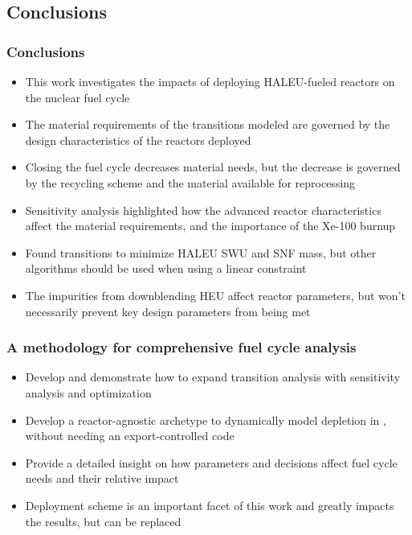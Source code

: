 \subsection{Conclusions}
\begin{frame}
      \frametitle{Conclusions}
      \begin{itemize}
        \item This work investigates the impacts of deploying \gls{HALEU}-fueled 
              reactors on the nuclear fuel cycle
        \item<2-> The material requirements of the transitions modeled are governed 
              by the design characteristics of the reactors deployed
        \item<2-> Closing the fuel cycle decreases material needs, but the 
              decrease is governed by the recycling scheme and the 
              material available for reprocessing
        \item<3-> Sensitivity analysis highlighted how the 
              advanced reactor characteristics affect the material requirements, and 
              the importance of the Xe-100 burnup
        \item<3-> Found transitions to minimize \gls{HALEU} \gls{SWU} 
              and \gls{SNF} mass, but other algorithms should 
              be used when using a linear constraint
        \item<4-> The impurities from downblending \gls{HEU} affect 
              reactor parameters, but won't necessarily prevent key design 
              parameters from being met
      \end{itemize}
\end{frame}

\begin{frame}
      \frametitle{A methodology for comprehensive fuel cycle analysis}
      \begin{itemize}
            \item Develop and demonstrate how to expand transition analysis with 
                  sensitivity analysis and optimization
            \item Develop a reactor-agnostic archetype to dynamically model depletion 
                  in \Cyclus, without needing an export-controlled code
            \item<2-> Provide a detailed insight on how parameters and 
                  decisions affect fuel cycle needs and their relative impact
            \item<3-> Deployment scheme is an important facet of this work and 
                  greatly impacts the results, but can be replaced
      \end{itemize}
\end{frame}

